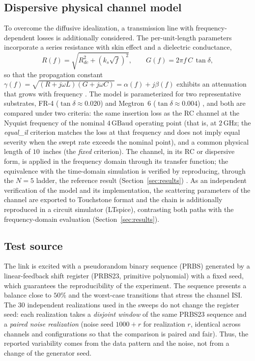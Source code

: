 \documentclass[preprint,review,12pt]{elsarticle}
\begin{document}
\subsection{Dispersive physical channel model}
To overcome the diffusive idealization, a transmission line with
frequency-dependent losses is additionally considered. The per-unit-length
parameters incorporate a series resistance with skin effect and a
dielectric conductance,
\begin{equation}
R(f)=\sqrt{R_{dc}^2+\left(k_s\sqrt{f}\right)^2},\qquad G(f)=2\pi f\,C\,\tan\delta,
\label{eq:rlgc}
\end{equation}
so that the propagation constant
$\gamma(f)=\sqrt{(R+j\omega L)(G+j\omega C)}=\alpha(f)+j\beta(f)$ exhibits
an attenuation that grows with frequency \citep{9888577,8861405}. The model
is parameterized for two representative substrates, FR-4
($\tan\delta\approx0.020$) and Megtron~6 ($\tan\delta\approx0.004$)
\citep{9785524,10385078}, and both are compared under two criteria: the
same insertion loss as the RC channel at the Nyquist frequency of the
nominal $4\,\mathrm{GBaud}$ operating point (that is, at $2\,\mathrm{GHz}$;
the \textit{equal\_il} criterion matches the loss at that frequency and
does not imply equal severity when the swept rate exceeds the nominal
point), and a common physical length of $10$~inches (the \textit{fixed}
criterion). The channel, in its RC or dispersive form, is applied in the
frequency domain through its transfer function; the equivalence with the
time-domain simulation is verified by reproducing, through the $N=5$
ladder, the reference result (Section~\ref{sec:results}) \citep{7445206}.
As an independent verification of the model and its implementation, the
scattering parameters of the channel are exported to Touchstone format and
the chain is additionally reproduced in a circuit simulator (LTspice),
contrasting both paths with the frequency-domain evaluation
(Section~\ref{sec:results}).

\subsection{Test source}
The link is excited with a pseudorandom binary sequence (PRBS) generated
by a linear-feedback shift register (PRBS23, primitive polynomial) with a
fixed seed, which guarantees the reproducibility of the experiment. The
sequence presents a balance close to $50\%$ and the worst-case
transitions that stress the channel ISI. The 30 independent realizations
used in the sweeps do not change the register seed: each realization takes
a \emph{disjoint window} of the same PRBS23 sequence and a \emph{paired
noise realization} (noise seed $1000{+}r$ for realization $r$, identical
across channels and configurations so that the comparison is paired and
fair). Thus, the reported variability comes from the data pattern and the
noise, not from a change of the generator seed.
\end{document}

